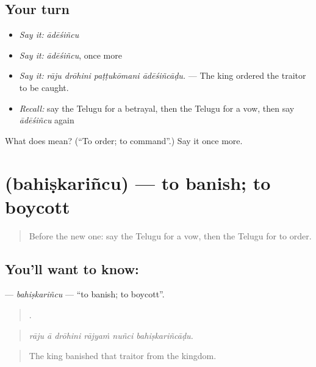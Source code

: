 \subsection*{Your turn}
\begin{itemize}
\raggedright
  \item \emph{Say it:} \emph{ādēśiñcu}
  \item \emph{Say it:} \emph{ādēśiñcu}, once more
  \item \emph{Say it:} \emph{rāju drōhini paṭṭukōmani ādēśiñcāḍu.} — The king ordered the traitor to be caught.
  \item \emph{Recall:} say the Telugu for a betrayal, then the Telugu for a vow, then say \emph{ādēśiñcu} again
\end{itemize}

\begin{tcolorbox}[breakable,colback=teal!4,colframe=teal!35!black,title={Before you move on}]
What does  mean? (\textquotedblleft{}To order; to command\textquotedblright{}.) Say it once more.
\end{tcolorbox}
\section[\texorpdfstring{\te{బహిష్కరించు} (bahiṣkariñcu)}{బహిష్కరించు (bahiṣkariñcu)}]{ (bahiṣkariñcu) — to banish; to boycott}

\label{lesson:TE-C365-bahiskarincu}



\begin{quote}
Before the new one: say the Telugu for a vow, then the Telugu for to order.
\end{quote}

\subsection*{You'll want to know: }
\textbf{} — \emph{bahiṣkariñcu} — \textquotedblleft{}to banish; to boycott\textquotedblright{}.

\begin{quote}
     .
\end{quote}

\begin{quote}
\emph{rāju ā drōhini rājyaṁ nuñci bahiṣkariñcāḍu.}
\end{quote}

\begin{quote}
The king banished that traitor from the kingdom.
\end{quote}

